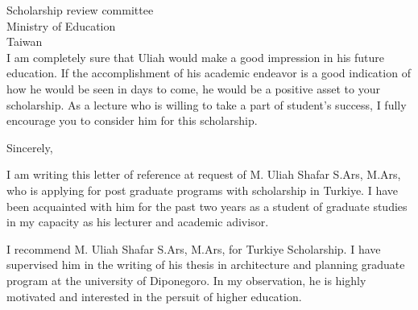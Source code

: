 \documentclass[12pt, a4paper]{simref} %
\begin{document}
\begin{letter}{
	Scholarship review committee\\
	Ministry of Education\\
	Taiwan\\
}
I am completely sure that Uliah would make a good impression in his future education.
If the accomplishment of his academic endeavor is a good indication of how he would be seen in days to come, he would be a positive asset to your scholarship. As a lecture who is willing to take a part of student's success, I fully encourage you to consider him for this scholarship.




\closing{Sincerely,}

\newpage

I am writing this letter of reference at request of M. Uliah Shafar S.Ars, M.Ars, who is applying for post graduate programs with scholarship in Turkiye.
I have been acquainted with him for the past two years
as a student of graduate studies in my capacity as his  lecturer and academic adivisor.

I recommend M. Uliah Shafar S.Ars, M.Ars, for Turkiye Scholarship. I have supervised him in the writing of his thesis in architecture and planning graduate program at the university of Diponegoro. In my observation, he is highly motivated and interested in the persuit of higher education.




\end{letter}
\end{document}
